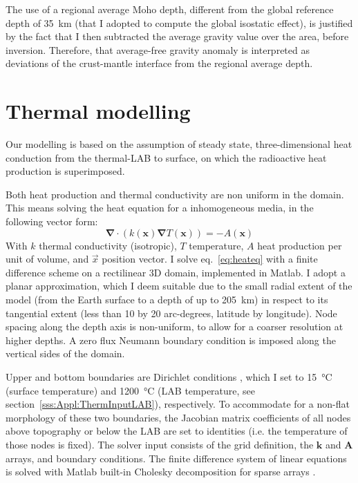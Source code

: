 The use of a regional average Moho depth, different from the global reference depth of \SI{35}{\kilo \metre} (that I adopted to compute the global isostatic effect), is justified by the fact that I then subtracted the average gravity value over the area, before inversion.
Therefore, that average-free gravity anomaly is interpreted as deviations of the crust-mantle interface from the regional average depth.

\section{Thermal modelling}
\label{s:Appl:Therm}
Our modelling is based on the assumption of steady state, three-dimensional heat conduction from the thermal-LAB to surface, on which the radioactive heat production is superimposed.

Both heat production and thermal conductivity are non uniform in the domain.
This means solving the heat equation for a inhomogeneous media, in the following vector form:
\begin{equation}
\label{eq:heateq}
\mathbf{\nabla} \cdot ( k(\mathbf{x}) \mathbf{\nabla} T(\mathbf{x}) ) = - A(\mathbf{x})
\end{equation}
With $k$ thermal conductivity (isotropic), $T$ temperature, $A$ heat production per unit of volume, and $\vec{x}$ position vector.
I solve eq.~\ref{eq:heateq} with a finite difference scheme on a rectilinear 3D domain, implemented in Matlab.
I adopt a planar approximation, which I deem suitable due to the small radial extent of the model (from the Earth surface to a depth of up to 205~\si{\kilo \metre}) in respect to its tangential extent (less than 10 by 20 arc-degrees, latitude by longitude).
Node spacing along the depth axis is non-uniform, to allow for a coarser resolution at higher depths.
A zero flux Neumann boundary condition \parencite{smith1985} is imposed along the vertical sides of the domain.

Upper and bottom boundaries are Dirichlet conditions \parencite{smith1985}, which I set to \SI{15}{\celsius} (surface temperature) and \SI{1200}{\celsius} (LAB temperature, see section~\ref{sss:Appl:ThermInputLAB}), respectively.
To accommodate for a non-flat morphology of these two boundaries, the Jacobian matrix coefficients of all nodes above topography or below the LAB are set to identities (i.e. the temperature of those nodes is fixed).
The solver input consists of the grid definition, the $\mathbf{k}$ and $\mathbf{A}$ arrays, and boundary conditions.
The finite difference system of linear equations is solved with Matlab built-in Cholesky decomposition for sparse arrays \parencite{Davis2006}.


